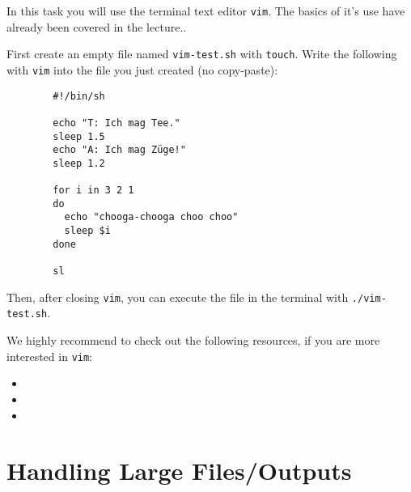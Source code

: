 \documentclass[english]{sheet}
\begin{document}
\begin{exercise}[subtitle=\texttt{vim}]
    In this task you will use the terminal text editor \texttt{vim}. The basics of it's use have already been covered in the lecture..

    First create an empty file named \texttt{vim-test.sh} with \texttt{touch}. Write the following with \texttt{vim} into the file you just created (no copy-paste):

    \begin{verbatim}
        #!/bin/sh

        echo "T: Ich mag Tee."
        sleep 1.5
        echo "A: Ich mag Züge!"
        sleep 1.2

        for i in 3 2 1
        do
          echo "chooga-chooga choo choo"
          sleep $i
        done

        sl
    \end{verbatim}

    Then, after closing \texttt{vim}, you can execute the file in the terminal with \texttt{./vim-test.sh}.

    We highly recommend to check out the following resources, if you are more interested in \texttt{vim}:

    \begin{itemize}
        \item {}
        \item {}
        \item {}
    \end{itemize}

\end{exercise}

\section{Handling Large Files/Outputs}
\end{document}
